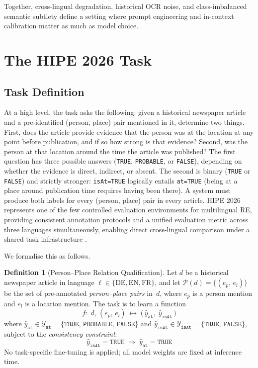 \documentclass[
]{ceurart}
\theoremstyle{definition}
\newtheorem{defn}{Definition}
\begin{document}
Together, cross-lingual degradation, historical OCR noise, and class-imbalanced semantic subtlety define a setting where prompt engineering and in-context calibration matter as much as model choice.


\section{The HIPE 2026 Task}\label{sec:task}

\subsection{Task Definition}

At a high level, the task asks the following: given a historical newspaper article and a pre-identified (person, place) pair mentioned in it, determine two things.
First, does the article provide evidence that the person was at the location at any point before publication, and if so how strong is that evidence?
Second, was the person at that location around the time the article was published?
The first question has three possible answers (\texttt{TRUE}, \texttt{PROBABLE}, or \texttt{FALSE}), depending on whether the evidence is direct, indirect, or absent.
The second is binary (\texttt{TRUE} or \texttt{FALSE}) and strictly stronger: \texttt{isAt=TRUE} logically entails \texttt{at=TRUE} (being at a place around publication time requires having been there).
A system must produce both labels for every (person, place) pair in every article.
HIPE 2026 \citep{opitz_extended_2026, opitz_overview_2026} represents one of the few controlled evaluation environments for multilingual RE, providing consistent annotation protocols and a unified evaluation metric across three languages simultaneously, enabling direct cross-lingual comparison under a shared task infrastructure \citep{ehrmann2020hipe,ehrmann2022hipe}.

We formalise this as follows.

\begin{defn}[Person--Place Relation Qualification]\label{def:rq}
Let $d$ be a historical newspaper article in language $\ell \in \{\mathrm{DE},\mathrm{EN},\mathrm{FR}\}$, and let
$\mathcal{P}(d) = \{(e_p,\,e_l)\}$
be the set of pre-annotated \emph{person--place pairs} in~$d$, where $e_p$ is a person mention and $e_l$ is a location mention. The task is to learn a function
\begin{equation}\label{eq:task}
  f:\; d,\,(e_p,\,e_l)\;\mapsto\;
  \bigl(\,\hat{y}_{\texttt{at}},\;\hat{y}_{\texttt{isAt}}\,\bigr)
\end{equation}
where $\hat{y}_{\texttt{at}} \in \mathcal{Y}_{\texttt{at}} = \{\texttt{TRUE},\,\texttt{PROBABLE},\,\texttt{FALSE}\}$ and $\hat{y}_{\texttt{isAt}} \in \mathcal{Y}_{\texttt{isAt}} = \{\texttt{TRUE},\,\texttt{FALSE}\}$, subject to the \emph{consistency constraint}:
\begin{equation}\label{eq:constraint}
  \hat{y}_{\texttt{isAt}} = \texttt{TRUE}
  \;\Rightarrow\;
  \hat{y}_{\texttt{at}} = \texttt{TRUE}
\end{equation}
No task-specific fine-tuning is applied; all model weights are fixed at inference time.
\end{defn}
\end{document}
